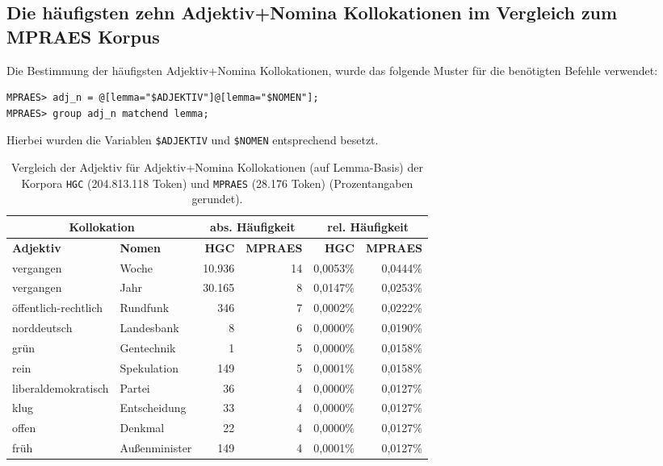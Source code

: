 \documentclass[%
	type=document,%
  	style=article,%
  	media=print,
  	pages=oneside,%
  	prefixLecturer=Dozenten:,
  	author=multiple,
]{unihildesheim} %
\begin{document}
\subsection{Die häufigsten zehn Adjektiv+Nomina Kollokationen im Vergleich zum
MPRAES Korpus}
Die Bestimmung der häufigsten Adjektiv+Nomina Kollokationen, wurde das folgende
Muster für die benötigten Befehle verwendet:
\begin{Verbatim}[frame=single,label=CQP,commandchars=\\\{\}]
MPRAES> adj_n = @[lemma="$ADJEKTIV"]@[lemma="$NOMEN"];
MPRAES> group adj_n matchend lemma;
\end{Verbatim}
Hierbei wurden die Variablen \texttt{\$ADJEKTIV} und \texttt{\$NOMEN}
entsprechend  besetzt.
\begin{table}[!hpb]\label{t}
	\center
	\begin{tabularx}{\textwidth}{llrrrr}
		\toprule
		\multicolumn{2}{c}{\textbf{Kollokation}} & \multicolumn{2}{c}{\textbf{abs.
		Häufigkeit}} & \multicolumn{2}{c}{\textbf{rel. Häufigkeit}} \\
		\midrule
		\textbf{Adjektiv} & \textbf{Nomen} & \textbf{HGC} & \textbf{MPRAES}
		&	\textbf{HGC} & \textbf{MPRAES} \\
		\midrule
		vergangen & Woche & 10.936 & 14 & 0,0053\% & 0,0444\%\\
		vergangen & Jahr & 30.165 & 8 & 0,0147\% & 0,0253\%\\
		öffentlich-rechtlich & Rundfunk & 346 & 7 & 0,0002\% & 0,0222\%\\
		norddeutsch & Landesbank & 8 & 6 & 0,0000\% & 0,0190\%\\
		grün & Gentechnik & 1 & 5 & 0,0000\% & 0,0158\%\\
		rein & Spekulation & 149 & 5 & 0,0001\% & 0,0158\%\\
		liberaldemokratisch & Partei & 36 & 4 & 0,0000\% & 0,0127\%\\
		klug & Entscheidung & 33 & 4 & 0,0000\% & 0,0127\%\\
		offen & Denkmal & 22 & 4 & 0,0000\% & 0,0127\%\\
		früh & Außenminister & 149 & 4 & 0,0001\% & 0,0127\%\\
		\bottomrule
	\end{tabularx}
	\caption{Vergleich der Adjektiv für Adjektiv+Nomina Kollokationen (auf
	Lemma-Basis) der Korpora \texttt{HGC} (204.813.118 Token) und \texttt{MPRAES} (28.176 Token)
	 (Prozentangaben gerundet).}
	\label{tab:compare_adj_n}
\end{table}
\end{document}
